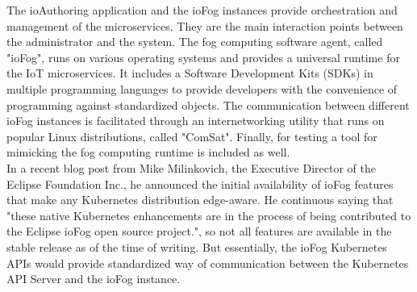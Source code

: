 The ioAuthoring application and the ioFog instances provide orchestration and management of the microservices. They are the main interaction points between the administrator and the system.
The fog computing software agent, called "ioFog", runs on various operating systems and provides a universal runtime for the IoT microservices. It includes a Software Development Kits (SDKs) in multiple programming languages to provide developers with the convenience of programming against standardized objects. The communication between different ioFog instances is facilitated through an internetworking utility that runs on popular Linux distributions, called "ComSat". Finally, for testing a tool for mimicking the fog computing runtime is included as well.\\
In a recent blog post from Mike Milinkovich, the Executive Director of the Eclipse Foundation Inc., he announced the initial availability of ioFog features that make any Kubernetes distribution edge-aware. He continuous saying that "these native Kubernetes enhancements are in the process of being contributed to the Eclipse ioFog open source project.", so not all features are available in the stable release as of the time of writing. But essentially, the ioFog Kubernetes APIs would provide standardized way of communication between the Kubernetes API Server and the ioFog instance.

